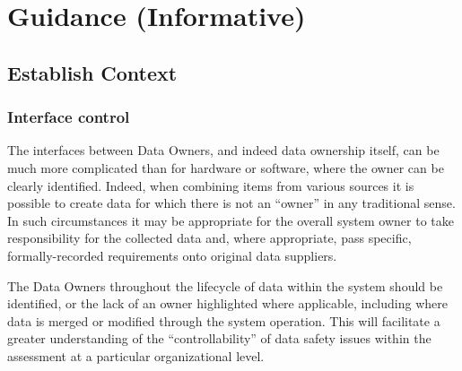 %
%
\section{Guidance (Informative)} \label{bkm:guidance}



\subsection{Establish Context}
\subsubsection{Interface control}
The interfaces between Data Owners, and indeed data ownership itself, can be much more complicated than for hardware or software, where the owner can be clearly identified. Indeed, when combining items from various sources it is possible to create data for which there is not an ``owner'' in any traditional sense. In such circumstances it may be appropriate for the overall system owner to take responsibility for the collected data and, where appropriate, pass specific, formally-recorded requirements onto original data suppliers. 

The Data Owners throughout the lifecycle of data within the system should be identified, or the lack of an owner highlighted where applicable, including where data is merged or modified through the system operation. This will facilitate a greater understanding of the ``controllability'' of data safety issues within the assessment at a particular organizational level.

